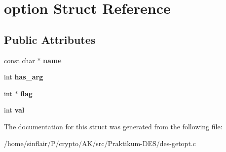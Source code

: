 \hypertarget{structoption}{}\section{option Struct Reference}
\label{structoption}
\subsection*{Public Attributes}
\begin{DoxyCompactItemize}
\item 
\mbox{\label{structoption_adc503659d37af8017fb4b86d61c99086}} 
const char $\ast$ {\bfseries name}
\item 
\mbox{\label{structoption_a90d7ee9a51eea5c002682dbd0af149e4}} 
int {\bfseries has\+\_\+arg}
\item 
\mbox{\label{structoption_ab366eea5fe7be25c1928328ba715e353}} 
int $\ast$ {\bfseries flag}
\item 
\mbox{\label{structoption_a13bd155ec3b405d29c41ab8d0793be11}} 
int {\bfseries val}
\end{DoxyCompactItemize}


The documentation for this struct was generated from the following file\+:\begin{DoxyCompactItemize}
\item 
/home/sinflair/\+P/crypto/\+A\+K/src/\+Praktikum-\/\+D\+E\+S/des-\/getopt.\+c\end{DoxyCompactItemize}
